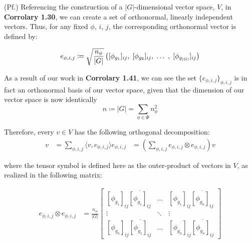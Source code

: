 \documentclass[10pt]{ucthesis}
\begin{document}
\noindent (Pf.) Referencing the construction of a $|G|$-dimensional vector space, $V$, in \textbf{Corrolary 1.30}, we can create a set of orthonormal, linearly independent vectors. Thus, for any fixed $\phi$, $i$, $j$, the corresponding orthonormal vector is defined by:

\begin{equation}
	\begin{aligned}
		e_{\phi,i,j} \coloneq \sqrt{\frac{n_\phi}{|G|}}\left([\phi_{g_1}]_{ij},\hspace{1mm} [\phi_{g_2}]_{ij}, \hspace{1mm}\hdots \hspace{1mm},\hspace{1mm} [\phi_{g_{|G|}}]_{ij}\right)
	\end{aligned}
\end{equation}

As a result of our work in \textbf{Corrolary 1.41}, we can see the set $\{e_{\phi,i,j}\}_{\phi,i,j}$ is in fact an orthonormal basis of our vector space, given that the dimension of our vector space is now identically 
$$n \coloneq |G| = \sum_{\phi\in \Phi} n_\phi^2$$

Therefore, every $v\in V$ has the following orthogonal decomposition:
\begin{equation}
	\begin{aligned}
		v &= \sum_{\phi,i,j} \langle v , e_{\phi,i,j} \rangle e_{\phi,i,j} &= \left(\sum_{\phi,i,j} e_{\phi,i,j} \otimes e_{\phi,i,j}\right) v
	\end{aligned}
\end{equation}

where the tensor symbol is defined here as the outer-product of vectors in $V$, as realized in the following matrix:

\begin{equation}
	\begin{aligned}
		e_{\phi,i,j} \otimes e_{\phi,i,j} &= \frac{n_\phi}{|G|}\begin{bmatrix}
			[\phi_{g_1}]_{ij}\overline{[\phi_{g_1}]_{ij}} & \hdots & [\phi_{g_1}]_{ij}\overline{[\phi_{g_n}]_{ij}}\\
			\vdots & \ddots & \vdots\\
			[\phi_{g_n}]_{ij}\overline{[\phi_{g_1}]_{ij}} & \hdots & [\phi_{g_n}]_{ij}\overline{[\phi_{g_n}]_{ij}}
		\end{bmatrix}
	\end{aligned}
\end{equation}
\end{document}
